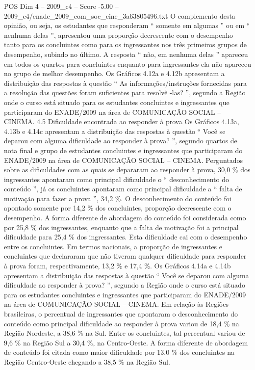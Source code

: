 \begin{textsample}{POS Dim 4 – 2009\_c4 – Score -5.00 – 2009\_c4/enade\_2009\_com\_soc\_cine\_3a63805496.txt}
O complemento desta opinião, ou seja, os estudantes que responderam “ somente em algumas ” ou em “ nenhuma delas ”, apresentou uma proporção decrescente com o desempenho tanto para os concluintes como para os ingressantes nos três primeiros grupos de desempenho, subindo no último.
A resposta “ não, em nenhuma delas ” apareceu em todos os quartos para concluintes enquanto para ingressantes ela não apareceu no grupo de melhor desempenho.
Os Gráficos 4.12a e 4.12b apresentam a distribuição das respostas à questão “ As informações/instruções fornecidas para a resolução das questões foram suficientes para resolvê -las? ”, segundo a Região onde o curso está situado para os estudantes concluintes e ingressantes que participaram do ENADE/2009 na área de COMUNICAÇÃO SOCIAL – CINEMA. 4.5 Dificuldade encontrada ao responder à prova Os Gráficos 4.13a, 4.13b e 4.14c apresentam a distribuição das respostas à questão “ Você se deparou com alguma dificuldade ao responder à prova? ”, segundo quartos de nota final e grupo de estudantes concluintes e ingressantes que participaram do ENADE/2009 na área de COMUNICAÇÃO SOCIAL – CINEMA.
Perguntados sobre as dificuldades com as quais se depararam ao responder à prova, 30,0 \% dos ingressantes apontaram como principal dificuldade o “ desconhecimento do conteúdo ”, já os concluintes apontaram como principal dificuldade a “ falta de motivação para fazer a prova ”, 34,2 \%.
O desconhecimento do conteúdo foi apontado somente por 14,2 \% dos concluintes, proporção decrescente com o desempenho.
A forma diferente de abordagem do conteúdo foi considerada como por 25,8 \% dos ingressantes, enquanto que a falta de motivação foi a principal dificuldade para 25,4 \% dos ingressantes.
Esta dificuldade cai com o desempenho entre os concluintes.
Em termos nacionais, a proporção de ingressantes e concluintes que declararam que não tiveram qualquer dificuldade para responder à prova foram, respectivamente, 13,2 \% e 17,4 \%.
Os Gráficos 4.14a e 4.14b apresentam a distribuição das respostas à questão “ Você se deparou com alguma dificuldade ao responder à prova? ”, segundo a Região onde o curso está situado para os estudantes concluintes e ingressantes que participaram do ENADE/2009 na área de COMUNICAÇÃO SOCIAL – CINEMA.
Em relação às Regiões brasileiras, o percentual de ingressantes que apontaram o desconhecimento do conteúdo como principal dificuldade ao responder à prova variou de 18,4 \% na Região Nordeste, a 38,6 \% na Sul.
Entre os concluintes, tal percentual variou de 9,6 \% na Região Sul a 30,4 \%, na Centro-Oeste.
A forma diferente de abordagem de conteúdo foi citada como maior dificuldade por 13,0 \% dos concluintes na Região Centro-Oeste chegando a 38,5 \% na Região Sul.

\end{textsample}
